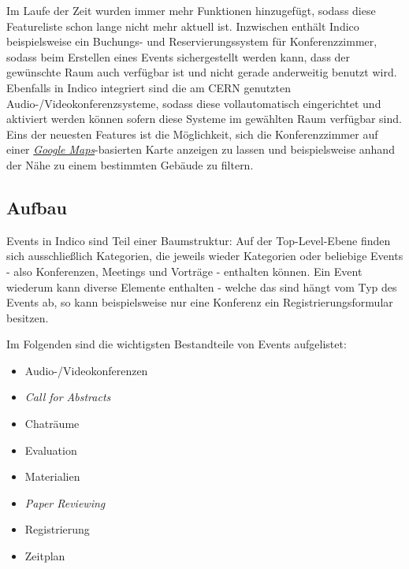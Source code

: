 Im Laufe der Zeit wurden immer mehr Funktionen hinzugefügt, sodass diese Featureliste schon lange
nicht mehr aktuell ist.  Inzwischen enthält Indico beispielsweise ein Buchungs- und
Reservierungssystem für Konferenzzimmer, sodass beim Erstellen eines Events sichergestellt werden
kann, dass der gewünschte Raum auch verfügbar ist und nicht gerade anderweitig benutzt wird.
Ebenfalls in Indico integriert sind die am CERN genutzten Audio-/Videokonferenzsysteme, sodass diese
vollautomatisch eingerichtet und aktiviert werden können sofern diese Systeme im gewählten Raum
verfügbar sind. Eins der neuesten Features ist die Möglichkeit, sich die Konferenzzimmer auf einer
\href{http://maps.google.com/}{\emph{Google Maps}}-basierten Karte anzeigen zu lassen und
beispielsweise anhand der Nähe zu einem bestimmten Gebäude zu filtern.

\subsection{Aufbau}
Events in Indico sind Teil einer Baumstruktur: Auf der Top-Level-Ebene finden sich ausschließlich
Kategorien, die jeweils wieder Kategorien oder beliebige Events - also Konferenzen, Meetings und
Vorträge - enthalten können. Ein Event wiederum kann diverse Elemente enthalten - welche das sind
hängt vom Typ des Events ab, so kann beispielsweise nur eine Konferenz ein Registrierungsformular
besitzen.

Im Folgenden sind die wichtigsten Bestandteile von Events aufgelistet:

\begin{itemize}
\item Audio-/Videokonferenzen
\item \emph{Call for Abstracts}
\item Chaträume
\item Evaluation
\item Materialien
\item \emph{Paper Reviewing}
\item Registrierung
\item Zeitplan
\end{itemize}

